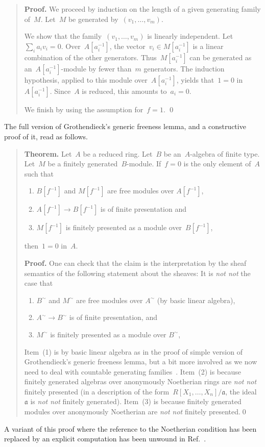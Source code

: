 \documentclass{ws-rv9x6}
\newcommand{\aaa}{\mathfrak{a}}
\renewcommand{\_}{\mathpunct{.}}
\newcommand{\?}{\,{:}\,}
\newcommand{\notnot}{\emph{not not}\xspace}
\begin{document}
\begin{quote}\textbf{Proof.}
We proceed by induction on the length of a given generating family
of~$M$. Let~$M$ be generated by~$(v_1,\ldots,v_m)$.

We show that the family~$(v_1,\ldots,v_m)$ is linearly independent. Let~$\sum_i
a_i v_i = 0$. Over~$A[a_i^{-1}]$, the vector~$v_i \in M[a_i^{-1}]$ is a linear
combination of the other generators. Thus~$M[a_i^{-1}]$ can be generated as
an~$A[a_i^{-1}]$-module by fewer than~$m$ generators. The induction hypothesis,
applied to this module over~$A[a_i^{-1}]$, yields that~$1 = 0$ in~$A[a_i^{-1}]$. Since~$A$ is
reduced, this amounts to~$a_i = 0$.

We finish by using the assumption for~$f = 1$. \qed
\end{quote}
The full version of Grothendieck's generic freeness lemma, and a constructive
proof of it, read as follows.\par
\begin{quote}
\textbf{Theorem.}
Let~$A$ be a reduced ring. Let~$B$ be an~$A$-algebra of finite type. Let~$M$ be
a finitely generated~$B$-module.
If~$f = 0$ is the only element of~$A$ such that
\begin{enumerate}
\item $B[f^{-1}]$ and $M[f^{-1}]$ are free modules over $A[f^{-1}]$,
\item $A[f^{-1}] \to B[f^{-1}]$ is of finite presentation and
\item $M[f^{-1}]$ is finitely presented as a module over~$B[f^{-1}]$,
\end{enumerate}
then~$1 = 0$ in~$A$.

\textbf{Proof.} One can check that the claim is the interpretation by the sheaf
semantics of the following statement about the sheaves: It is \notnot the case that
\begin{enumerate}
  \item $B^\sim$ and $M^\sim$ are free modules over $A^\sim$ (by basic linear algebra),
  \item $A^\sim \to B^\sim$ is of finite presentation, and
  \item $M^\sim$ is finitely presented as a module over $B^\sim$,
\end{enumerate}

Item~(1) is by basic linear algebra as in the proof of
simple version of Grothendieck's generic freeness lemma, but a bit more involved as we now need to
deal with countable generating
families~\cite[Theorem~11.16]{blechschmidt:phd}. Item~(2) is because finitely
generated algebras over anonymously Noetherian rings are \notnot finitely
presented (in a description of the form~$R[X_1,\ldots,X_n]/\aaa$, the
ideal~$\aaa$ is \notnot finitely generated).
Item~(3) is because finitely generated modules over anonymously Noetherian are
\notnot finitely presented.\qed
\end{quote}
A variant of this proof where the reference to the Noetherian condition has
been replaced by an explicit computation has been unwound in
Ref.~.
\end{document}
